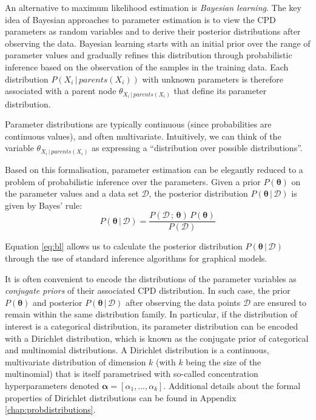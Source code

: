 An alternative to maximum likelihood estimation is \textit{Bayesian learning}.  The key idea of Bayesian approaches to parameter estimation is to view the CPD parameters as random variables and to derive their posterior distributions after observing the data.  Bayesian learning starts with an initial prior over the range of parameter values and gradually refines this distribution through probabilistic inference based on the observation of the samples in the training data. Each distribution $P(X_i \, | \, \mathit{parents}(X_i))$ with unknown parameters is therefore associated with a parent node $\theta_{X_i\, | \, \mathit{parents}(X_i)}$ that define its parameter distribution.  

Parameter distributions are typically continuous (since probabilities are continuous values), and often multivariate.  Intuitively, we can think of the variable $\theta_{X_i \, | \, \mathit{parents}(X_i)}$ as expressing a ``distribution over possible distributions''.  

Based on this formalisation, parameter estimation can be elegantly reduced to a problem of probabilistic inference over the parameters. Given a prior $P(\boldsymbol\theta)$ on the parameter values and a data set $\mathcal{D}$, the posterior distribution $P(\boldsymbol\theta  \, | \, \mathcal{D})$ is given by Bayes' rule: 
\begin{equation}
P(\boldsymbol\theta  \, | \, \mathcal{D}) =  \frac{P(\mathcal{D} \, ; \, \boldsymbol\theta) \, P(\boldsymbol\theta)}{P(\mathcal{D})} \label{eq:bl}
\end{equation}


Equation \ref{eq:bl} allows us to calculate the posterior distribution $P(\boldsymbol\theta  \, | \, \mathcal{D})$ through the use of standard inference algorithms for graphical models. 

It is often convenient to encode the distributions of the parameter variables as \textit{conjugate priors} of their associated CPD distribution. In such case, the prior $P(\boldsymbol\theta)$ and posterior $P(\boldsymbol\theta  \, | \, \mathcal{D})$ after observing the data points $\mathcal{D}$ are ensured to remain within the same distribution family. In particular, if the distribution of interest is a categorical distribution, its parameter distribution can be encoded with a Dirichlet distribution, which is known as the conjugate prior of categorical and multinomial distributions. A Dirichlet distribution is a continuous, multivariate distribution of dimension $k$ (with $k$ being the size of the multinomial) that is itself parametrised with so-called concentration hyperparameters denoted $\boldsymbol\alpha = [ \alpha_1, \dots, \alpha_k ]$. Additional details about the formal properties of Dirichlet distributions can be found in Appendix \ref{chap:probdistributions}.

